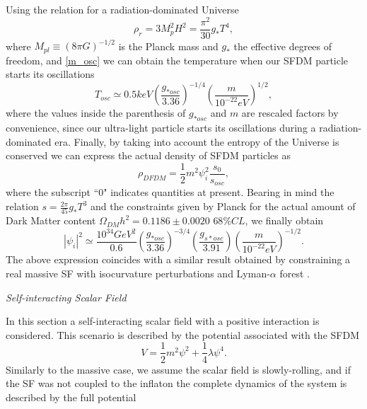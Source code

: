 \documentclass[amssymb,twocolumn,prd,nofootinbib,showpacs]{revtex4-1}
\begin{document}
Using the relation for a radiation-dominated Universe
%
\begin{equation}
\rho_r = 3M_p^2H^2=\frac{\pi^2}{30}g_*T^4,
\end{equation}
%
where $M_{pl}\equiv (8\pi G)^{-1/2}$ is the Planck mass and $g_*$ the effective degrees of freedom, 
and \eqref{m_osc} we can obtain the temperature when our SFDM particle starts its oscillations
%
\begin{equation}
T_{osc}\simeq 0.5 keV\left(\frac{g_{*osc}}{3.36}\right)^{-1/4}\left(\frac{m}{10^{-22}eV}\right)^{1/2},
\end{equation}
where the values inside the parenthesis of $g_{*osc}$ and $m$ are rescaled factors by convenience,
 since our ultra-light particle starts its oscillations during a radiation-dominated era. 
%
Finally, by taking into account the entropy of the Universe is conserved we 
can express the actual density of SFDM particles as
\begin{equation}
\rho_{DFDM}=\frac{1}{2}m^2\psi_i^2\frac{s_0}{s_{osc}},
\end{equation}
%
where the subscript ``$0$" indicates quantities at present. 
Bearing in mind the relation  $s=\frac{2\pi}{45}g_{*}T^3$ and the constraints 
given by Planck \cite{Planckcolaboration} for the actual amount of Dark Matter 
content $\Omega_{DM}h^2=0.1186\pm 0.0020$ $68\% CL$, we finally obtain 
%
\begin{equation}\label{phi_im2}
|\psi_i|^2\simeq\frac{10^{34}GeV^2}{0.6}\left(\frac{g_{*osc}}{3.36}\right)^{-3/4}\left(\frac{g_{s*osc}}{3.91}\right)\left(\frac{m}{10^{-22}eV}\right)^{-1/2}.
\end{equation}
%
The above expression coincides with a similar result obtained by constraining a real massive SF
with isocurvature perturbations and Lyman-$\alpha$ forest \cite{SFrev2}. 
\begin{center}
\textit{Self-interacting Scalar Field}
\end{center}


In this section a self-interacting scalar field with a positive interaction is considered. 
This scenario is described by the potential associated with the SFDM
%
\begin{equation}
V = \frac{1}{2}m^2\psi^2+\frac{1}{4}\lambda \psi^4.
\end{equation}
%
Similarly to the massive case, we assume the scalar field is slowly-rolling, and
if the SF was not coupled to the inflaton the complete dynamics of the system 
is described by the full potential 
\end{document}
